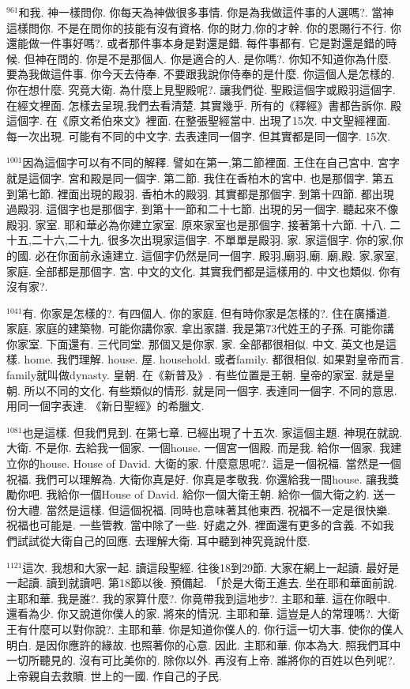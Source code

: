 \documentclass{book}
\begin{document}
$^{961}$和我.
神一樣問你.
你每天為神做很多事情.
你是為我做這件事的人選嗎?.
當神這樣問你.
不是在問你的技能有沒有資格.
你的財力,你的才幹.
你的恩賜行不行.
你還能做一件事好嗎?.
或者那件事本身是對還是錯.
每件事都有.
它是對還是錯的時候.
但神在問的.
你是不是那個人.
你是適合的人.
是你嗎?.
你知不知道你為什麼.
要為我做這件事.
你今天去侍奉.
不要跟我說你侍奉的是什麼.
你這個人是怎樣的.
你在想什麼.
究竟大衛.
為什麼上見聖殿呢?.
讓我們從.
聖殿這個字或殿羽這個字.
在經文裡面.
怎樣去呈現,我們去看清楚.
其實幾乎.
所有的《釋經》書都告訴你.
殿這個字.
在《原文希伯來文》裡面.
在整張聖經當中.
出現了15次.
中文聖經裡面.
每一次出現.
可能有不同的中文字.
去表達同一個字.
但其實都是同一個字.
15次.

$^{1001}$因為這個字可以有不同的解釋.
譬如在第一,第二節裡面.
王住在自己宮中.
宮字就是這個字.
宮和殿是同一個字.
第二節.
我住在香柏木的宮中.
也是那個字.
第五到第七節.
裡面出現的殿羽.
香柏木的殿羽.
其實都是那個字.
到第十四節.
都出現過殿羽.
這個字也是那個字.
到第十一節和二十七節.
出現的另一個字.
聽起來不像殿羽.
家室.
耶和華必為你建立家室.
原來家室也是那個字.
接著第十六節.
十八.
二十五,二十六,二十九.
很多次出現家這個字.
不單單是殿羽.
家.
家這個字.
你的家,你的國.
必在你面前永遠建立.
這個字仍然是同一個字.
殿羽,廟羽,廟.
廟,殿.
家,家室,家庭.
全部都是那個字.
宮.
中文的文化.
其實我們都是這樣用的.
中文也類似.
你有沒有家?.

$^{1041}$有.
你家是怎樣的?.
有四個人.
你的家庭.
但有時你家是怎樣的?.
住在廣播道.
家庭.
家庭的建築物.
可能你講你家.
拿出家譜.
我是第73代姓王的子孫.
可能你講你家室.
下面還有.
三代同堂.
那個又是你家.
家.
全部都很相似.
中文.
英文也是這樣.
home.
我們理解.
house.
屋.
household.
或者family.
都很相似.
如果對皇帝而言.
family就叫做dynasty.
皇朝.
在《新普及》.
有些位置是王朝.
皇帝的家室.
就是皇朝.
所以不同的文化.
有些類似的情形.
就是同一個字.
表達同一個字.
不同的意思.
用同一個字表達.
《新日聖經》的希臘文.

$^{1081}$也是這樣.
但我們見到.
在第七章.
已經出現了十五次.
家這個主題.
神現在就說.
大衛.
不是你.
去給我一個家.
一個house.
一個宮一個殿.
而是我.
給你一個家.
我建立你的house.
House of David.
大衛的家.
什麼意思呢?.
這是一個祝福.
當然是一個祝福.
我們可以理解為.
大衛你真是好.
你真是孝敬我.
你還給我一間house.
讓我獎勵你吧.
我給你一個House of David.
給你一個大衛王朝.
給你一個大衛之約.
送一份大禮.
當然是這樣.
但這個祝福.
同時也意味著其他東西.
祝福不一定是很快樂.
祝福也可能是.
一些管教.
當中除了一些.
好處之外.
裡面還有更多的含義.
不如我們試試從大衛自己的回應.
去理解大衛.
耳中聽到神究竟說什麼.

$^{1121}$這次.
我想和大家一起.
讀這段聖經.
往後18到29節.
大家在網上一起讀.
最好是一起讀.
讀到就讀吧.
第18節以後.
預備起.
「於是大衛王進去.
坐在耶和華面前說.
主耶和華.
我是誰?.
我的家算什麼?.
你竟帶我到這地步?.
主耶和華.
這在你眼中.
還看為少.
你又說道你僕人的家.
將來的情況.
主耶和華.
這豈是人的常理嗎?.
大衛王有什麼可以對你說?.
主耶和華.
你是知道你僕人的.
你行這一切大事.
使你的僕人明白.
是因你應許的緣故.
也照著你的心意.
因此.
主耶和華.
你本為大.
照我們耳中一切所聽見的.
沒有可比美你的.
除你以外.
再沒有上帝.
誰將你的百姓以色列呢?.
上帝親自去救贖.
世上的一國.
作自己的子民.
\end{document}
